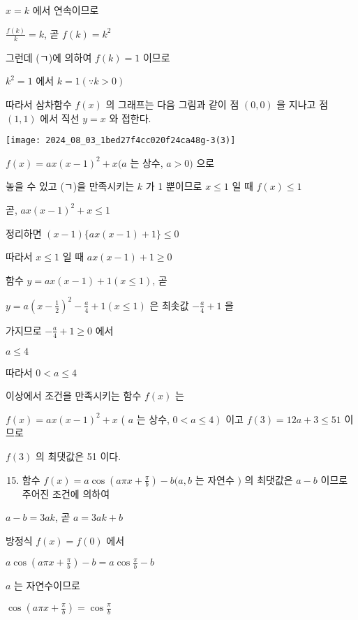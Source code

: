 \documentclass[10pt]{article}
\begin{document}
\(x=k\) 에서 연속이므로

\(\frac{f(k)}{k}=k\), 곧 \(f(k)=k^{2}\)

그런데 (ㄱ)에 의하여 \(f(k)=1\) 이므로

\(k^{2}=1\) 에서 \(k=1(\because k>0)\)

따라서 삼차함수 \(f(x)\) 의 그래프는 다음 그림과 같이 점 \((0,0)\) 을 지나고 점 \((1,1)\) 에서 직선 \(y=x\) 와 접한다.

\begin{center}
\texttt{[image: 2024\_08\_03\_1bed27f4cc020f24ca48g-3(3)]}
\end{center}

\(f(x)=a x(x-1)^{2}+x(a\) 는 상수, \(a>0)\) 으로

놓을 수 있고 (ㄱ)을 만족시키는 \(k\) 가 1 뿐이므로 \(x \leq 1\) 일 때 \(f(x) \leq 1\)

곧, \(a x(x-1)^{2}+x \leq 1\)

정리하면 \((x-1)\{a x(x-1)+1\} \leq 0\)

따라서 \(x \leq 1\) 일 때 \(a x(x-1)+1 \geq 0\)

함수 \(y=a x(x-1)+1(x \leq 1)\), 곧

\(y=a\left(x-\frac{1}{2}\right)^{2}-\frac{a}{4}+1(x \leq 1)\) 은 최솟값 \(-\frac{a}{4}+1\) 을

가지므로 \(-\frac{a}{4}+1 \geq 0\) 에서

\(a \leq 4\)

따라서 \(0<a \leq 4\)

이상에서 조건을 만족시키는 함수 \(f(x)\) 는

\(f(x)=a x(x-1)^{2}+x\) ( \(a\) 는 상수, \(\left.0<a \leq 4\right)\) 이고 \(f(3)=12 a+3 \leq 51\) 이므로

\(f(3)\) 의 최댓값은 51 이다.

\begin{enumerate}
  \setcounter{enumi}{14}
  \item 함수 \(f(x)=a \cos \left(a \pi x+\frac{\pi}{b}\right)-b(a, b\) 는 자연수 \()\) 의 최댓값은 \(a-b\) 이므로 주어진 조건에 의하여
\end{enumerate}

\(a-b=3 a k\), 곧 \(a=3 a k+b\)

방정식 \(f(x)=f(0)\) 에서

\(a \cos \left(a \pi x+\frac{\pi}{b}\right)-b=a \cos \frac{\pi}{b}-b\)

\(a\) 는 자연수이므로

\(\cos \left(a \pi x+\frac{\pi}{b}\right)=\cos \frac{\pi}{b}\)
\end{document}
